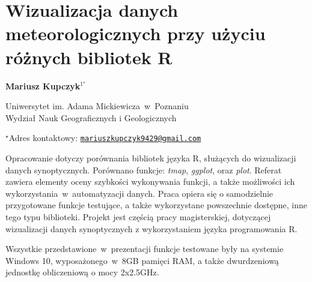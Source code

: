 \documentclass[\main/boa.tex]{subfiles}
\begin{document}
\section{Wizualizacja danych meteorologicznych przy użyciu różnych bibliotek R}

\begin{center}
  {\bf {} Mariusz Kupczyk$^{1^\star}$}
\end{center}

\vskip 0.3cm

\begin{affiliations}
\begin{enumerate}
\begin{minipage}{0.915\textwidth}
\centering
\item Uniwersytet im. Adama Mickiewicza~w~Poznaniu\\ Wydział Nauk Geograficznych i Geologicznych
\end{minipage}
\end{enumerate}
$^\star$Adres kontaktowy: \href{mailto:mariuszkupczyk9429@gmail.com	}{\nolinkurl{mariuszkupczyk9429@gmail.com}}\\
\end{affiliations}

\vskip 0.5cm


\vskip 0.5cm

Opracowanie dotyczy porównania bibliotek języka R, służących do wizualizacji danych synoptycznych. Porównano funkcje: \emph{tmap}, \emph{ggplot}, oraz \emph{plot}. Referat zawiera elementy oceny szybkości wykonywania funkcji, a także możliwości ich wykorzystania~w~automatyzacji danych. Praca opiera się o samodzielnie przygotowane funkcje testujące, a także wykorzystane powszechnie dostępne, inne tego typu biblioteki. Projekt jest częścią pracy magisterskiej, dotyczącej wizualizacji danych synoptycznych z wykorzystaniem języka programowania R. 

Wszystkie przedstawione~w~prezentacji funkcje testowane były na systemie Windows 10, wyposażonego~w~8GB pamięci RAM, a także dwurdzeniową jednostkę obliczeniową o mocy 2x2.5GHz. 
\end{document}
